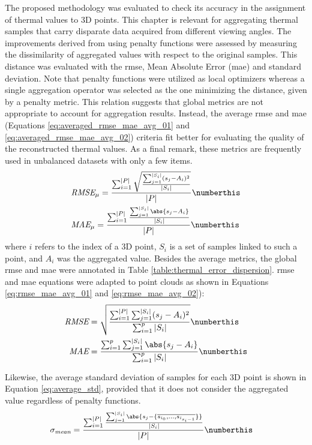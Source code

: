 The proposed methodology was evaluated to check its accuracy in the assignment of thermal values to 3D points. This chapter is relevant for aggregating thermal samples that carry disparate data acquired from different viewing angles. The improvements derived from using penalty functions were assessed by measuring the dissimilarity of aggregated values with respect to the original samples. This distance was evaluated with the \acrshort{rmse}, Mean Absolute Error (\acrshort{mae}) and standard deviation. Note that penalty functions were utilized as local optimizers whereas a single aggregation operator was selected as the one minimizing the distance, given by a penalty metric. This relation suggests that global metrics are not appropriate to account for aggregation results. Instead, the average \acrshort{rmse} and \acrshort{mae} (Equations \ref{eq:averaged_rmse_mae_avg_01} and \ref{eq:averaged_rmse_mae_avg_02}) criteria fit better for evaluating the quality of the reconstructed thermal values. As a final remark, these metrics are frequently used in unbalanced datasets with only a few items.
\begin{align*}
    &\textit{RMSE}_{\mu} = \frac{\sum_{i=1}^{|P|} \sqrt{\frac{\sum_{j=1}^{|S_i|} (s_j - A_i)^2}{|S_i|}}}{|P|}
    \numberthis \label{eq:averaged_rmse_mae_avg_01}\\
    &\textit{MAE}_{\mu} = \frac{\sum_{i=1}^{|P|} \frac{\sum_{j=1}^{|S_i|} \abs{s_j - A_i}}{|S_i|}}{|P|}
    \numberthis \label{eq:averaged_rmse_mae_avg_02}
\end{align*}
where $i$ refers to the index of a 3D point, $S_i$ is a set of samples linked to such a point, and $A_i$ was the aggregated value. Besides the average metrics, the global \acrshort{rmse} and \acrshort{mae} were annotated in Table \ref{table:thermal_error_dispersion}. \acrshort{rmse} and \acrshort{mae} equations were adapted to point clouds as shown in Equations \ref{eq:rmse_mae_avg_01} and \ref{eq:rmse_mae_avg_02}):
\begin{align*}
    \textit{RMSE} &= \sqrt{\frac{\sum_{i=1}^{|P|} \sum_{j=1}^{|S_i|} (s_j - A_i)^2}{\sum_{i=1}^{p} |S_i|}}
    \numberthis \label{eq:rmse_mae_avg_01}\\
    \textit{MAE} &= \frac{\sum_{i=1}^{p} \sum_{j=1}^{|S_i|} \abs{s_j - A_i}}{\sum_{i=1}^{p} |S_i|}
    \numberthis \label{eq:rmse_mae_avg_02}
\end{align*}

Likewise, the average standard deviation of samples for each 3D point is shown in Equation \ref{eq:average_std}, provided that it does not consider the aggregated value regardless of penalty functions. 
\begin{align*}
    &\sigma_{\textit{mean}} = \frac{\sum_{i=1}^{|P|} \frac{\sum_{j=1}^{|S_i|} \abs{s_j - \{\overline{s_{i_0},...,s_{i_{s_i-1}}}\}}}{|S_i|}}{|P|} 
    \numberthis \label{eq:average_std}
\end{align*}

